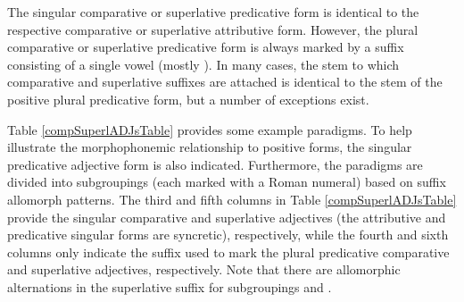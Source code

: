 The singular comparative or superlative predicative form is identical %
to the respective comparative or superlative attributive form. However, the plural comparative or superlative predicative form is always marked by a suffix consisting of a single vowel (mostly ). In many cases, the stem to which comparative and superlative suffixes are attached is identical %
to the stem of the positive plural predicative form, but a number of exceptions exist. 

Table \vref{compSuperlADJsTable} provides some example paradigms. 
To help illustrate the morphophonemic relationship to positive forms, the singular predicative adjective form is also indicated. %
Furthermore, the paradigms are divided into subgroupings (each marked with a Roman numeral) based on suffix allomorph patterns. The third and fifth columns in Table \ref{compSuperlADJsTable} provide the singular comparative and superlative adjectives (the attributive and predicative singular forms are syncretic), respectively, while the fourth and sixth columns only indicate the suffix used to mark the plural predicative comparative and superlative adjectives, respectively. Note that there are allomorphic alternations in the superlative suffix for subgroupings  and . %

